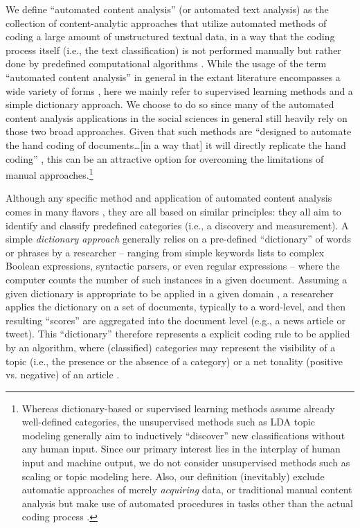 \documentclass[man, floatsintext, 12pt, a4paper, noextraspace]{apa6}
\begin{document}
    We define \enquote{automated content analysis} (or automated text analysis) as the collection of content-analytic approaches that utilize automated methods of coding a large amount of unstructured textual data, in a way that the coding process itself (i.e., the text classification) is not performed manually but rather done by predefined computational algorithms \parencite{trilling2018scaling, grimmer2013text}. While the usage of the term \enquote{automated content analysis} in general in the extant literature encompasses a wide variety of forms \parencites[e.g.,][]{riff2014analyzing, Hopkins_King2010, Krippendorff2013, grimmer2013text}, here we mainly refer to supervised learning methods and a simple dictionary approach. We choose to do so since many of the automated content analysis applications in the social sciences in general still heavily rely on those two broad approaches. Given that such methods are \enquote{designed to automate the hand coding of documents\ldots[in a way that] it will directly replicate the hand coding} \parencites[][p. 13]{grimmer2013text}, this can be an attractive option for overcoming the limitations of manual approaches.\footnote{ Whereas dictionary-based or supervised learning methods assume already well-defined categories, the unsupervised methods such as LDA topic modeling \parencites[][]{dimaggio2013exploiting, maier2018applying} generally aim to inductively \enquote{discover} new classifications without any human input. Since our primary interest lies in the interplay of human input and machine output, we do not consider unsupervised methods such as scaling or topic modeling here. Also, our definition (inevitably) exclude automatic approaches of merely \textit{acquiring} data, or traditional manual content analysis but make use of automated procedures in tasks other than the actual coding process \parencites[such as in data entry or data management: e.g.,][]{lewis2013content}.}
    
    Although any specific method and application of automated content analysis comes in many flavors \parencites[for a broad overview, see:][]{Boumans_Trilling_2016, grimmer2013text}, they are all based on similar principles: they all aim to identify and classify predefined categories (i.e., a discovery and measurement). A simple \textit{dictionary approach} generally relies on a pre-defined “dictionary” of words or phrases by a researcher -- ranging from simple keywords lists to complex Boolean expressions, syntactic parsers, or even regular expressions -- where the computer counts the number of such instances in a given document. Assuming a given dictionary is appropriate to be applied in a given domain \parencite{Boumans_Trilling_2016, gonzalez2015signals}, a researcher applies the dictionary on a set of documents, typically to a word-level, and then resulting \enquote{scores} are aggregated into the document level (e.g., a news article or tweet). This \enquote{dictionary} therefore represents a explicit coding rule to be applied by an algorithm, where (classified) categories may represent the visibility of a topic (i.e., the presence or the absence of a category) or a net tonality (positive vs. negative) of an article \parencites[e.g.,][]{Aaldering2016, YoungSoroka2012, boomgaaden2009, gonzalez2015signals, Rooduijn2011}. 
    
\end{document}
